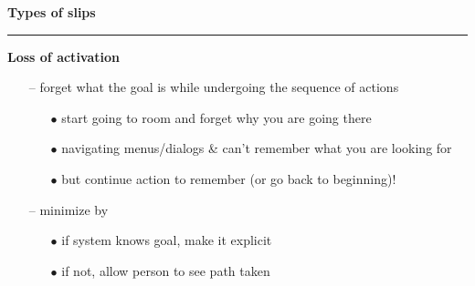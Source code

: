 \documentclass[pdf]{beamer}
\begin{document}
\begin{frame}
{\textbf{Types of slips}}{\textcolor{red}{\rule{12cm}{1.2pt}}}

	\textbf{Loss of activation}
	\begin{itemize}
    	\item[--] forget what the goal is while undergoing the sequence of actions
		\begin{itemize}
        	\item[$\bullet$]start going to room and forget why you are going there
			\item[$\bullet$]navigating menus/dialogs \& can’t remember what you are looking for
			\item[$\bullet$]but continue action to remember (or go back to beginning)! \newline
        \end{itemize}
        \item[--] minimize by
        \begin{itemize}
        	\item[$\bullet$]if system knows goal, make it explicit
			\item[$\bullet$]if not, allow person to see path taken \newline \newline \newline
        \end{itemize}
	\end{itemize}
	
\end{frame}
\end{document}
